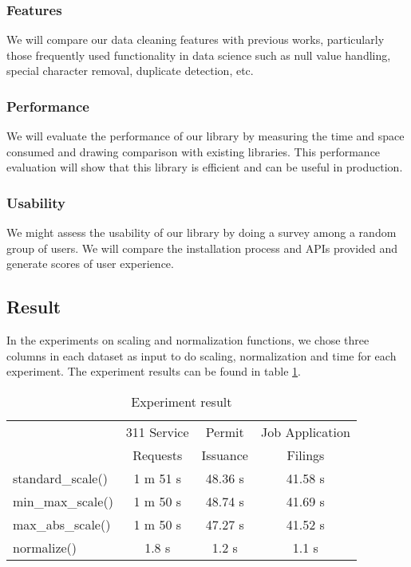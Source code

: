 \documentclass[sigconf]{acmart}
\begin{document}
\subsubsection{Features}
We will compare our data cleaning features with previous works, particularly those frequently used functionality in data science such as null value handling, special character removal, duplicate detection, etc. 
\subsubsection{Performance}
We will evaluate the performance of our library by measuring the time and space consumed and drawing comparison with existing libraries. This performance evaluation will show that this library is efficient and can be useful in production. 
\subsubsection{Usability}
We might assess the usability of our library by doing a survey among a random group of users. We will compare the installation process and APIs provided and generate scores of user experience.

\subsection{Result}
In the experiments on scaling and normalization functions, we chose three columns in each dataset as input to do scaling, normalization and time for each experiment. The experiment results can be found in table \ref{tab:Experiment result}.

\begin{table}
\caption{Experiment result}   
\label{tab:Experiment result}
\begin{tabular}{lccc}   
 	                      &  311 Service  &  Permit    &  Job Application \\ &Requests&Issuance&Filings   \\  
\hline
standard\_scale()   & 1 m 51 s     & 48.36 s & 41.58 s            \\ 
min\_max\_scale()  &  1 m 50 s   & 48.74 s  & 41.69 s             \\  
max\_abs\_scale()  & 1 m 50 s     &  47.27 s  & 41.52 s             \\ 
normalize()           &  1.8 s     &  1.2 s & 1.1 s             \\ 

\end{tabular}   
\end{table}
\end{document}
